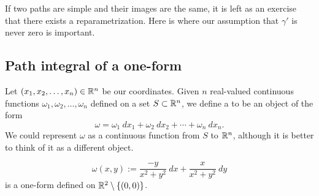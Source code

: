 If two paths are simple and their images are the same, it is
left as an exercise that there exists a reparametrization.
Here is where our assumption that $\gamma'$ is never zero is important.

\subsection{Path integral of a one-form}

\begin{defn}
Let $(x_1,x_2,\ldots,x_n) \in {\mathbb{R}}^n$ be our coordinates.
Given $n$ real-valued continuous functions
$\omega_1,\omega_2,\ldots,\omega_n$ defined on a set $S \subset {\mathbb{R}}^n$,
we define a \emph{}
to be an object of the form
\begin{equation*}
\omega = \omega_1 ~dx_1 + \omega_2 ~dx_2 + \cdots + \omega_n ~dx_n .
\end{equation*}
We could represent $\omega$ as a continuous function from $S$ to ${\mathbb{R}}^n$,
although it is better to think of it as a different object.
\end{defn}

\begin{example}
\begin{equation*}
\omega(x,y) := \frac{-y}{x^2+y^2} ~dx + \frac{x}{x^2+y^2} ~dy
\end{equation*}
is a one-form defined on ${\mathbb{R}}^2 \setminus \{ (0,0) \}$.
\end{example}

